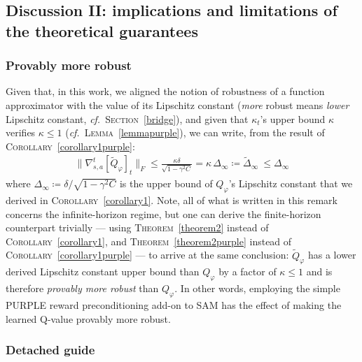\subsection{Discussion II: implications and limitations of the theoretical guarantees}
\label{discussionpurple}

\subsubsection{Provably more robust}
\label{morerobust}

Given that, in this work, we aligned the notion of robustness of a function approximator
with the value of its Lipschitz constant (\emph{more} robust means \emph{lower} Lipschitz constant,
\textit{cf.}~\textsc{Section}~\ref{bridge}), and given that $\kappa_t$'s upper bound $\kappa$
verifies $\kappa \leq 1$ (\textit{cf.}~\textsc{Lemma}~\ref{lemmapurple}), we can write,
from the result of \textsc{Corollary}~\ref{corollary1purple}:
\begin{align}
\lVert \nabla_{s,a}^t[\widetilde{Q}_\varphi]_t \rVert _F
\leq \frac{\kappa \delta}{\sqrt{1 - \gamma^2 C}}
= \kappa \, \Delta_\infty
\coloneqq \widetilde{\Delta}_\infty
\: \leq \Delta_\infty
\label{tildeqlip}
\end{align}
where $\Delta_\infty \coloneqq \delta / \sqrt{1 - \gamma^2 C}$
is the upper bound of $Q_\varphi$'s Lipschitz constant that we derived in \textsc{Corollary}~\ref{corollary1}.
Note, all of what is written in this remark concerns the infinite-horizon regime,
but one can derive the finite-horizon counterpart trivially --- using
\textsc{Theorem}~\ref{theorem2} instead of \textsc{Corollary}~\ref{corollary1},
and \textsc{Theorem}~\ref{theorem2purple} instead of \textsc{Corollary}~\ref{corollary1purple} ---
to arrive at the same conclusion:
$\widetilde{Q}_\varphi$ has a lower derived Lipschitz constant upper bound than $Q_\varphi$
by a factor of $\kappa \leq 1$ and is therefore \emph{provably more robust} than $Q_\varphi$.
In other words, employing the simple PURPLE reward preconditioning add-on to SAM has the effect of
making the learned Q-value provably more robust.

\subsubsection{Detached guide}

